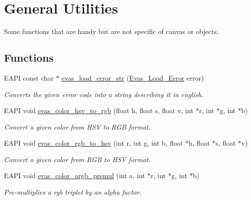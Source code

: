\section{General Utilities}
\label{group__Evas__Utils}


Some functions that are handy but are not specific of canvas or objects.  


\subsection*{Functions}
\begin{DoxyCompactItemize}
\item 
EAPI const char $\ast$ \hyperlink{group__Evas__Utils_ga50bb423e88ce97cf82cca9b316fc7a1a}{evas\_\-load\_\-error\_\-str} (\hyperlink{Evas_8h_aff351ae694a58aecd7834ef12bdf3d64}{Evas\_\-Load\_\-Error} error)
\begin{DoxyCompactList}\small\item\em Converts the given error code into a string describing it in english. \item\end{DoxyCompactList}\item 
EAPI void \hyperlink{group__Evas__Utils_ga2a28c2e6ecdc72189040ae3f5bd829d0}{evas\_\-color\_\-hsv\_\-to\_\-rgb} (float h, float s, float v, int $\ast$r, int $\ast$g, int $\ast$b)
\begin{DoxyCompactList}\small\item\em Convert a given color from HSV to RGB format. \item\end{DoxyCompactList}\item 
EAPI void \hyperlink{group__Evas__Utils_ga4054acb14873d5923306ddde5537171d}{evas\_\-color\_\-rgb\_\-to\_\-hsv} (int r, int g, int b, float $\ast$h, float $\ast$s, float $\ast$v)
\begin{DoxyCompactList}\small\item\em Convert a given color from RGB to HSV format. \item\end{DoxyCompactList}\item 
EAPI void \hyperlink{group__Evas__Utils_ga892ffc2ac011e24a141816e0c72f7dfa}{evas\_\-color\_\-argb\_\-premul} (int a, int $\ast$r, int $\ast$g, int $\ast$b)
\begin{DoxyCompactList}\small\item\em Pre-\/multiplies a rgb triplet by an alpha factor. \item\end{DoxyCompactList}\item 

\end{DoxyCompactItemize}
